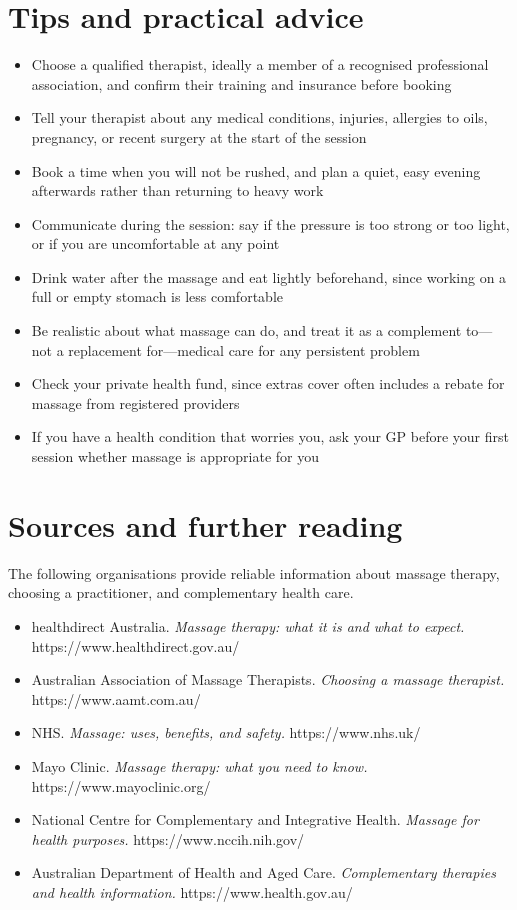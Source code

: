 \section*{Tips and practical advice}
\begin{itemize}
    \item Choose a qualified therapist, ideally a member of a recognised professional association, and confirm their training and insurance before booking
    \item Tell your therapist about any medical conditions, injuries, allergies to oils, pregnancy, or recent surgery at the start of the session
    \item Book a time when you will not be rushed, and plan a quiet, easy evening afterwards rather than returning to heavy work
    \item Communicate during the session: say if the pressure is too strong or too light, or if you are uncomfortable at any point
    \item Drink water after the massage and eat lightly beforehand, since working on a full or empty stomach is less comfortable
    \item Be realistic about what massage can do, and treat it as a complement to---not a replacement for---medical care for any persistent problem
    \item Check your private health fund, since extras cover often includes a rebate for massage from registered providers
    \item If you have a health condition that worries you, ask your GP before your first session whether massage is appropriate for you
\end{itemize}

\section*{Sources and further reading}
The following organisations provide reliable information about massage therapy, choosing a practitioner, and complementary health care.

\begin{itemize}
    \item healthdirect Australia. \textit{Massage therapy: what it is and what to expect.} https://www.healthdirect.gov.au/
    \item Australian Association of Massage Therapists. \textit{Choosing a massage therapist.} https://www.aamt.com.au/
    \item NHS. \textit{Massage: uses, benefits, and safety.} https://www.nhs.uk/
    \item Mayo Clinic. \textit{Massage therapy: what you need to know.} https://www.mayoclinic.org/
    \item National Centre for Complementary and Integrative Health. \textit{Massage for health purposes.} https://www.nccih.nih.gov/
    \item Australian Department of Health and Aged Care. \textit{Complementary therapies and health information.} https://www.health.gov.au/
\end{itemize}

\clearpage
